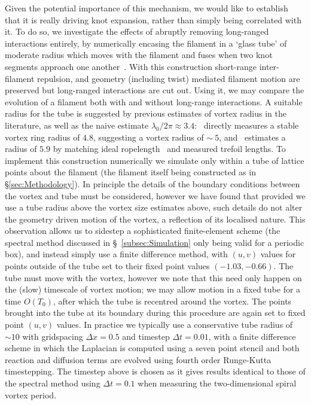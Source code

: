 Given the potential importance of this mechanism, we would like to establish that it is really driving knot expansion, rather than simply being correlated with it. To do so, we investigate the effects of abruptly removing long-ranged interactions entirely, by numerically encasing the filament in a `glass tube' of moderate radius which moves with the filament and fuses when two knot segments approach one another~\citep{Winfree1983b}. With this construction short-range inter-filament repulsion, and geometry (including twist) mediated filament motion are preserved but long-ranged interactions are cut out. Using it, we may compare the evolution of a filament both with and without long-range interactions. A suitable radius for the tube is suggested by previous estimates of vortex radius in the literature, as well as the naive estimate $\lambda_0/2 \pi \approx 3.4$:~\citep{Courtemanche1990} directly measures a stable vortex ring radius of $4.8$, suggesting a vortex radius of $\sim~5$, and~\citep{Maucher2017} estimates a radius of $5.9$ by matching ideal ropelength~\citep{Cantarella2011} and measured trefoil lengths. To implement this construction numerically we simulate only within a tube of lattice points about the filament (the filament itself being constructed as in \S\ref{sec:Methodology}). In principle the details of the boundary conditions between the vortex and tube must be considered, however we have found that provided we use a tube radius above the vortex size estimates above, such details do not alter the geometry driven motion of the vortex, a reflection of its localised nature. This observation allows us to sidestep a sophisticated finite-element scheme (the spectral method discussed in \S~\ref{subsec:Simulation} only being valid for a periodic box), and instead simply use a finite difference method, with $(u,v)$ values for points outside of the tube set to their fixed point values $(-1.03,-0.66)$. The tube must move with the vortex, however we note that this need only happen on the (slow) timescale of vortex motion; we may allow motion in a fixed tube for a time $O(T_0)$, after which the tube is recentred around the vortex. The points brought into the tube at its boundary during this procedure are again set to fixed point $(u,v)$ values. In practice we typically use a conservative tube radius of $\sim 10$ with gridspacing $\Delta x = 0.5$ and timestep $\Delta t = 0.01$, with a finite difference scheme in which the Laplacian is computed using a seven point stencil and both reaction and diffusion terms are evolved using fourth order Runge-Kutta timestepping. The timestep above is chosen as it gives results identical to those of the spectral method using $\Delta t = 0.1$ when measuring the two-dimensional spiral vortex period. 

